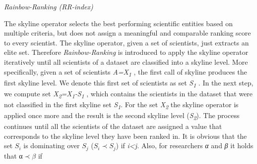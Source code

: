 \emph{Rainbow-Ranking (RR-index)}

The skyline operator selects the best performing scientific entities
based on multiple criteria, but does not assign a meaningful and
comparable ranking score to every scientist. The skyline operator, given
a set of scientists, just extracts an elite set. Therefore
\emph{Rainbow-Ranking} is in­troduced to apply the skyline operator
iteratively until all scientists of a dataset are classified into a
skyline level. More specifically, given a set of scientists
\emph{A=X\textsubscript{1}} , the first call of skyline produces the
first skyline level. We denote this first set of scientists as set
\emph{S\textsubscript{1}} . In the next step, we compute set
\emph{X\textsubscript{2}=X\textsubscript{1}-S\textsubscript{1}} , which
contains the scientists in the dataset that were not classified in the
first skyline set \emph{S\textsubscript{1}}. For the set
\emph{X\textsubscript{2}} the skyline operator is applied once more and
the result is the second skyline level (\emph{S\textsubscript{2}}). The
process continues until all the scientists of the dataset are assigned a
value that corresponds to the skyline level they have been ranked in. It
is obvious that the set \(S_{i}\) is dominating over \(S_{j}\)
(\(S_{i} \prec S_{j}\)) if \emph{i\textless{}j.} Also, for researchers
\emph{α} and \emph{β} it holds that α\(\prec \beta\) if
